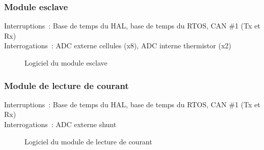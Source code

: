 	\subsubsection*{Module esclave}
		\noindent
		Interruptions : Base de temps du HAL, base de temps du RTOS, CAN \#1 (Tx et Rx) \\
		Interrogations : ADC externe cellules (x8), ADC interne thermistor (x2)
		\begin{figure}[H]
			\centering
			\caption{Logiciel du module esclave}
			\label{fig:logiciel_slave}
		\end{figure}
	
	\newpage
	\subsubsection*{Module de lecture de courant}
		\noindent
		Interruptions : Base de temps du HAL, base de temps du RTOS, CAN \#1 (Tx et Rx) \\
		Interrogations : ADC externe shunt
		\begin{figure}[H]
			\centering
			\caption{Logiciel du module de lecture de courant}
			\label{fig:logiciel_current_sense}
		\end{figure}
